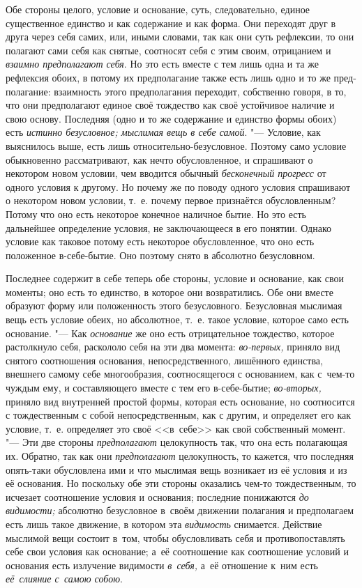 Обе стороны целого, условие и основание, суть, следовательно, единое
существенное единство и как содержание и как форма. Они переходят друг в
друга через себя самих, или, иными словами, так как они суть рефлексии, то
они полагают сами себя как снятые, соотносят себя с этим своим, отрицанием
и {\em взаимно предполагают себя}. Но это есть вместе с
тем лишь одна и та же рефлексия обоих, в потому их предполагание также есть
лишь одно и то же пред- полагание: взаимность этого предполагания
переходит, собственно говоря, в то, что они предполагают единое своё
тождество как своё устойчивое наличие и свою основу. Последняя (одно и то
же содержание и единство формы обоих) есть {\em истинно
безусловное; мыслимая вещь в себе самой}. "--- Условие, как выяснилось выше,
есть лишь относительно-безусловное. Поэтому само условие обыкновенно
рассматривают, как нечто обусловленное, и спрашивают о некотором новом
условии, чем вводится обычный {\em бесконечный
прогресс} от одного условия к другому. Но почему же по поводу одного
условия спрашивают о некотором новом условии, т.~е. почему первое
признаётся обусловленным? Потому что оно есть некоторое конечное наличное
бытие. Но это есть дальнейшее определение условия, не заключающееся в его
понятии. Однако условие как таковое потому есть некоторое обусловленное,
что оно есть положенное в-себе-бытие. Оно поэтому снято в абсолютно
безусловном.

Последнее содержит в себе теперь обе стороны, условие и основание, как свои
моменты; оно есть то единство, в которое они возвратились. Обе они вместе
образуют форму или положенность этого безусловного. Безусловная мыслимая вещь
есть условие обеих, но абсолютное, т.~е. такое условие, которое само есть
основание. "--- Как {\em основание} же оно есть отрицательное тождество,
которое растолкнуло себя, раскололо себя на эти два момента: {\em во-первых,}
приняло вид снятого соотношения основания, непосредственного, лишённого
единства, внешнего самому себе многообразия, соотносящегося с основанием, как
с~чем-то чуждым ему, и составляющего вместе с тем его в-себе-бытие;
{\em во-вторых,} приняло вид внутренней простой формы, которая есть основание,
но соотносится с тождественным с собой непосредственным, как с другим, и
определяет его как условие, т.~е. определяет это своё <<в~себе>> как свой
собственный момент. "--- Эти две стороны {\em предполагают} целокупность так,
что она есть полагающая их. Обратно, так как они {\em предполагают}
целокупность, то кажется, что последняя опять-таки обусловлена ими и что
мыслимая вещь возникает из её условия и из её основания. Но поскольку обе эти
стороны оказались чем-то тождественным, то исчезает соотношение условия и
основания; последние понижаются {\em до видимости;} абсолютно безусловное
в~своём движении полагания и предполагаем есть лишь такое движение, в котором
эта {\em видимость} снимается. Действие мыслимой вещи состоит в~том, чтобы
обусловливать себя и противопоставлять себе свои условия как основание; а~её
соотношение как соотношение условий и основания есть излучение видимости
{\em в~себя,} а~её отношение к~ним есть {\em её~слияние с~самою собою}.

